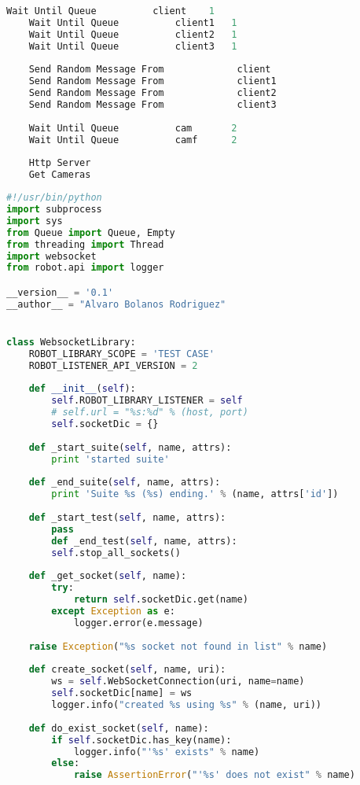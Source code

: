 \documentclass[hidelinks,11pt,a4paper,oneside,article]{memoir}
\begin{document}
\begin{lstlisting}[label={listing:robottest},caption={RobotFramework test file},language=Python, style=styleprogrammingappendix]
    Wait Until Queue          client    1
    Wait Until Queue          client1   1
    Wait Until Queue          client2   1
    Wait Until Queue          client3   1
    
    Send Random Message From             client
    Send Random Message From             client1
    Send Random Message From             client2
    Send Random Message From             client3
    
    Wait Until Queue          cam       2
    Wait Until Queue          camf      2
    
    Http Server
    Get Cameras
\end{lstlisting}

\begin{lstlisting}[label={listing:robotlib},caption={RobotFramework websocket library},language=Python, style=styleprogrammingappendix]
#!/usr/bin/python
import subprocess
import sys
from Queue import Queue, Empty
from threading import Thread
import websocket
from robot.api import logger

__version__ = '0.1'
__author__ = "Alvaro Bolanos Rodriguez"


class WebsocketLibrary:
    ROBOT_LIBRARY_SCOPE = 'TEST CASE'
    ROBOT_LISTENER_API_VERSION = 2
    
    def __init__(self):
        self.ROBOT_LIBRARY_LISTENER = self
        # self.url = "%s:%d" % (host, port)
        self.socketDic = {}
    
    def _start_suite(self, name, attrs):
        print 'started suite'
    
    def _end_suite(self, name, attrs):
        print 'Suite %s (%s) ending.' % (name, attrs['id'])
    
    def _start_test(self, name, attrs):
        pass
        def _end_test(self, name, attrs):
        self.stop_all_sockets()
    
    def _get_socket(self, name):
        try:
            return self.socketDic.get(name)
        except Exception as e:
            logger.error(e.message)
    
    raise Exception("%s socket not found in list" % name)
    
    def create_socket(self, name, uri):
        ws = self.WebSocketConnection(uri, name=name)
        self.socketDic[name] = ws
        logger.info("created %s using %s" % (name, uri))
    
    def do_exist_socket(self, name):
        if self.socketDic.has_key(name):
            logger.info("'%s' exists" % name)
        else:
            raise AssertionError("'%s' does not exist" % name)
    

\end{lstlisting}
\end{document}
